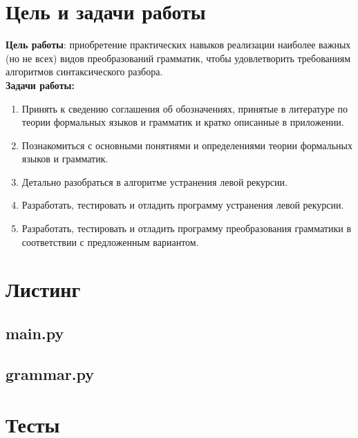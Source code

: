 \newpage
	\section{Цель и задачи работы}
		\textbf{Цель работы}: приобретение практических навыков реализации наиболее важных (но не всех) видов 
			преобразований грамматик, чтобы удовлетворить требованиям алгоритмов синтаксического разбора.\\

		\textbf{Задачи работы:}
		\begin{enumerate}
			\item Принять к сведению соглашения об обозначениях, принятые в литературе по теории формальных языков и 
				грамматик и кратко описанные в приложении.
			\item Познакомиться с основными понятиями и определениями теории формальных языков и грамматик.
			\item Детально разобраться в алгоритме устранения левой рекурсии.
			\item Разработать, тестировать и отладить программу устранения левой рекурсии.
			\item Разработать, тестировать и отладить программу преобразования грамматики в соответствии с 
				предложенным вариантом.
		\end{enumerate}


	\section{Листинг}
        
        
        \subsection{main.py}
        

        \subsection{grammar.py}
        



	\section{Тесты}
